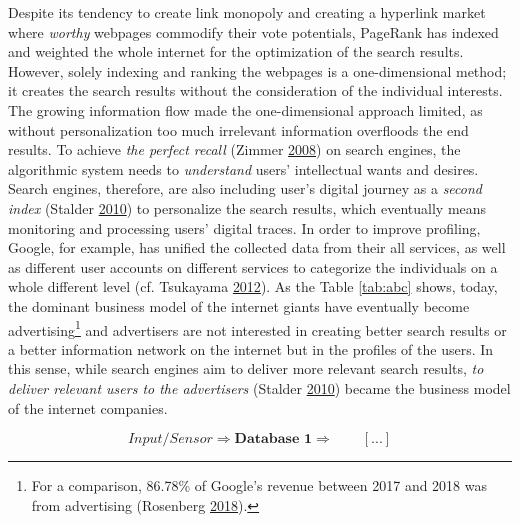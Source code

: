 \documentclass[12pt,twoside]{report}
\let\rmarkdownfootnote\footnote%
\def\footnote{\protect\rmarkdownfootnote}
\begin{document}
Despite its tendency to create link monopoly and creating a hyperlink market where \emph{worthy} webpages commodify their vote potentials, PageRank has indexed and weighted the whole internet for the optimization of the search results. However, solely indexing and ranking the webpages is a one-dimensional method; it creates the search results without the consideration of the individual interests. The growing information flow made the one-dimensional approach limited, as without personalization too much irrelevant information overfloods the end results. To achieve \emph{the perfect recall} (Zimmer \protect\hyperlink{ref-Zimmer2008}{2008}) on search engines, the algorithmic system needs to \emph{understand} users' intellectual wants and desires. Search engines, therefore, are also including user's digital journey as a \emph{second index} (Stalder \protect\hyperlink{ref-Stalder2009}{2010}) to personalize the search results, which eventually means monitoring and processing users' digital traces. In order to improve profiling, Google, for example, has unified the collected data from their all services, as well as different user accounts on different services to categorize the individuals on a whole different level (cf. Tsukayama \protect\hyperlink{ref-Tsukayama2012}{2012}). As the Table \ref{tab:abc} shows, today, the dominant business model of the internet giants have eventually become advertising\footnote{For a comparison, 86.78\% of Google's revenue between 2017 and 2018 was from advertising (Rosenberg \protect\hyperlink{ref-Rosenberg2018}{2018}).} and advertisers are not interested in creating better search results or a better information network on the internet but in the profiles of the users. In this sense, while search engines aim to deliver more relevant search results, \emph{to deliver relevant users to the advertisers} (Stalder \protect\hyperlink{ref-Stalder2009}{2010}) became the business model of the internet companies.

\[ Input/Sensor \Rightarrow \textbf{Database 1} \Rightarrow \qquad [...]\]
\end{document}
